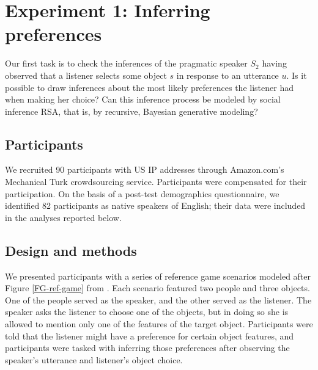 \documentclass[10pt,a4paper]{article}
\begin{document}
\section{Experiment 1: Inferring preferences}

Our first task is to check the inferences of the pragmatic speaker $S_2$ having observed that a listener selects some object $s$ in response to an utterance $u$. 
Is it possible to draw inferences about the most likely preferences the listener had when making her choice? 
Can this inference process be modeled by social inference RSA, that is, by recursive, Bayesian generative modeling?

\subsection{Participants}

We recruited 90 participants with US IP addresses through Amazon.com's Mechanical Turk crowdsourcing service. Participants were compensated for their participation. On the basis of a post-test demographics questionnaire, we identified 82 participants as native speakers of English; their data were included in the analyses reported below.

\subsection{Design and methods}

We presented participants with a series of reference game scenarios modeled after Figure \ref{FG-ref-game} from . Each scenario featured two people and three objects. One of the people served as the speaker, and the other served as the listener. The speaker asks the listener to choose one of the objects, but in doing so she is allowed to mention only one of the features of the target object. Participants were told that the listener might have a preference for certain object features, and participants were tasked with inferring those preferences after observing the speaker's utterance and listener's object choice.
\end{document}
